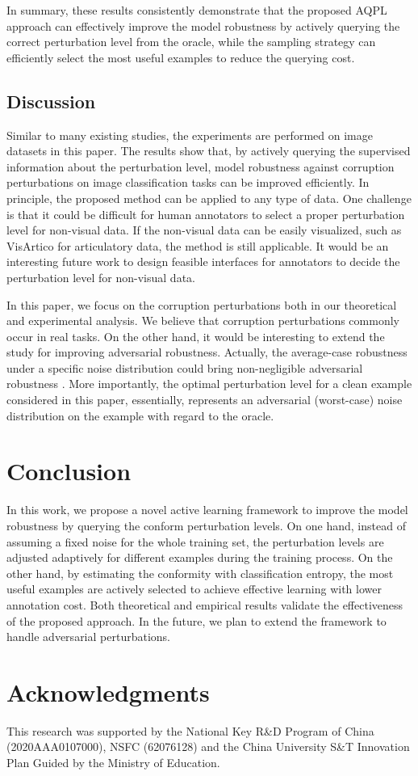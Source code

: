 \documentclass[letterpaper]{article} %
\begin{document}
In summary, these results consistently demonstrate that the proposed AQPL approach can effectively improve the model robustness by actively querying the correct perturbation level from the oracle, while the sampling strategy can efficiently select the most useful examples to reduce the querying cost.


\subsection{Discussion}

Similar to many existing studies, the experiments are performed on image datasets in this paper. The results show that, by actively querying the supervised information about the perturbation level, model robustness against corruption perturbations on image classification tasks can be improved efficiently. In principle, the proposed method can be applied to any type of data. One challenge is that it could be difficult for human annotators to select a proper perturbation level for non-visual data. If the non-visual data can be easily visualized, such as VisArtico \cite{ouni2012visartico} for articulatory data, the method is still applicable. It would be an interesting future work to design feasible interfaces for annotators to decide the perturbation level for non-visual data. 

In this paper, we focus on the corruption perturbations both in our theoretical and experimental analysis. We believe that corruption perturbations commonly occur in real tasks. On the other hand, it would be interesting to extend the study for improving adversarial robustness. Actually, the average-case robustness under a specific noise distribution could bring non-negligible adversarial robustness \cite{wong2020learning}. More importantly, the optimal perturbation level for a clean example considered in this paper, essentially, represents an adversarial (worst-case) noise distribution on the example with regard to the oracle.


\section{Conclusion}

In this work, we propose a novel active learning framework to improve the model robustness by querying the conform perturbation levels. On one hand, instead of assuming a fixed noise for the whole training set, the perturbation levels are adjusted adaptively for different examples during the training process. On the other hand, by estimating the conformity with classification entropy, the most useful examples are actively selected to achieve effective learning with lower annotation cost. Both theoretical and empirical results validate the effectiveness of the proposed approach. In the future, we plan to extend the framework to handle adversarial perturbations.


\section{ Acknowledgments}

This research was supported by the National Key R\&D Program of China (2020AAA0107000), NSFC (62076128) and the China University S\&T Innovation Plan Guided by the Ministry of Education.


\end{document}
